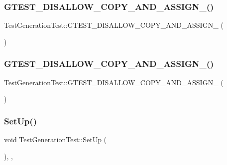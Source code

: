 \subsubsection{\texorpdfstring{GTEST\_DISALLOW\_COPY\_AND\_ASSIGN\_()}{GTEST\_DISALLOW\_COPY\_AND\_ASSIGN\_()}\hspace{0.1cm}{\footnotesize\ttfamily [2/3]}}
{\footnotesize\ttfamily Test\+Generation\+Test\+::\+G\+T\+E\+S\+T\+\_\+\+D\+I\+S\+A\+L\+L\+O\+W\+\_\+\+C\+O\+P\+Y\+\_\+\+A\+N\+D\+\_\+\+A\+S\+S\+I\+G\+N\+\_\+ (\begin{DoxyParamCaption}\item[{\mbox{\hyperlink{class_test_generation_test}{Test\+Generation\+Test}}}]{ }\end{DoxyParamCaption})\hspace{0.3cm}{\ttfamily [private]}}

\mbox{\label{class_test_generation_test_a896a79483bc30b0e0c39716ab17da8f1}} 
\subsubsection{\texorpdfstring{GTEST\_DISALLOW\_COPY\_AND\_ASSIGN\_()}{GTEST\_DISALLOW\_COPY\_AND\_ASSIGN\_()}\hspace{0.1cm}{\footnotesize\ttfamily [3/3]}}
{\footnotesize\ttfamily Test\+Generation\+Test\+::\+G\+T\+E\+S\+T\+\_\+\+D\+I\+S\+A\+L\+L\+O\+W\+\_\+\+C\+O\+P\+Y\+\_\+\+A\+N\+D\+\_\+\+A\+S\+S\+I\+G\+N\+\_\+ (\begin{DoxyParamCaption}\item[{\mbox{\hyperlink{class_test_generation_test}{Test\+Generation\+Test}}}]{ }\end{DoxyParamCaption})\hspace{0.3cm}{\ttfamily [private]}}

\mbox{\label{class_test_generation_test_a06cbce86435733a568824f9641ea57c2}} 
\subsubsection{\texorpdfstring{SetUp()}{SetUp()}\hspace{0.1cm}{\footnotesize\ttfamily [1/3]}}
{\footnotesize\ttfamily void Test\+Generation\+Test\+::\+Set\+Up (\begin{DoxyParamCaption}{ }\end{DoxyParamCaption})\hspace{0.3cm}{\ttfamily [inline]}, {\ttfamily [override]}, {\ttfamily [virtual]}}



